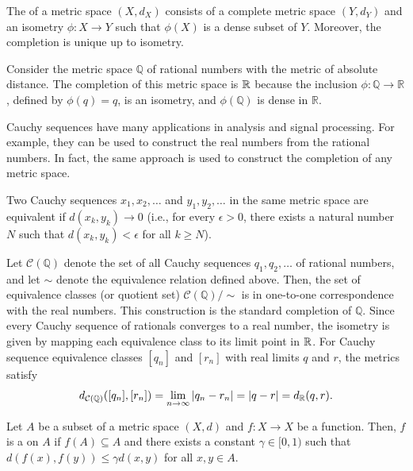 \begin{definition}
The  of a metric space $(X,d_X)$ consists of a complete metric space $(Y,d_Y)$ and an isometry $\phi  \colon X \rightarrow Y$ such that $\phi(X)$ is a dense subset of $Y$.
Moreover, the completion is unique up to isometry.
\end{definition}

\begin{example}
Consider the metric space $\mathbb{Q}$ of rational numbers with the metric of absolute distance.
The completion of this metric space is $\mathbb{R}$ because the inclusion $\phi\colon \mathbb Q \to \mathbb R$, defined by $\phi(q)=q$, is an isometry, and $\phi(\mathbb Q)$ is dense in $\mathbb R$.
\end{example}

Cauchy sequences have many applications in analysis and signal processing.
For example, they can be used to construct the real numbers from the rational numbers.
In fact, the same approach is used to construct the completion of any metric space.

\begin{definition}
Two Cauchy sequences $x_1, x_2, \ldots$ and $y_1, y_2, \ldots$ in the same metric space are equivalent if $d(x_k,y_k)\to0$ (i.e., for every $\epsilon >0$, there exists a natural number $N$ such that $d (x_k, y_k) < \epsilon$ for all $k \geq N$).
\end{definition}

\begin{example}
Let $\mathcal C(\mathbb Q)$ denote the set of all Cauchy sequences $q_1, q_2, \ldots$ of rational numbers, and let $\sim$ denote the equivalence relation defined above.
Then, the set of equivalence classes (or quotient set) $\mathcal{C}(\mathbb{Q}) / \! \sim$ is in one-to-one correspondence with the real numbers.
This construction is the standard completion of $\mathbb{Q}$.
Since every Cauchy sequence of rationals converges to a real number, the isometry is given by mapping each equivalence class to its limit point in $\mathbb{R}$.
For Cauchy sequence equivalence classes $[q_n]$ and $[r_n]$ with real limits $q$ and $r$, the metrics satisfy
\[d_{\mathcal{C}(\mathbb Q)}([q_n],[r_n])=\lim_{n\to\infty}|q_n-r_n|=|q-r|=d_{\mathbb{R}}(q,r). \]
\end{example}

\begin{definition}
Let $A$ be a subset of a metric space $(X,d)$ and $f \colon X \rightarrow X$ be a function.
Then, $f$ is a  on $A$ if $f(A) \subseteq A$ and there exists a constant $\gamma \in [0,1)$ such that $d \left( f(x),f(y) \right) \leq \gamma  d(x,y)$ for all $x,y\in A$.
\end{definition}

